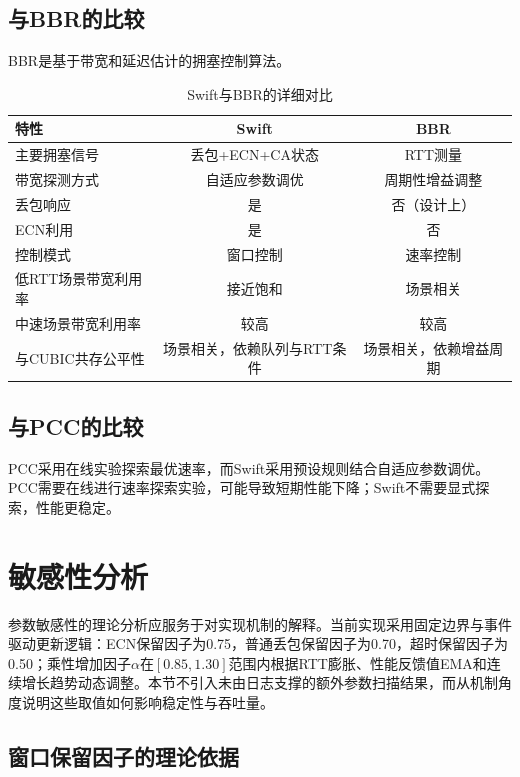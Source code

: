 \subsection{与BBR的比较}

BBR是基于带宽和延迟估计的拥塞控制算法。

\begin{table}[htbp]
\centering
\caption{Swift与BBR的详细对比}
\label{tab:vs_bbr}
\begin{tabular}{|l|c|c|}
\hline
\textbf{特性} & \textbf{Swift} & \textbf{BBR} \\
\hline
主要拥塞信号 & 丢包+ECN+CA状态 & RTT测量 \\
带宽探测方式 & 自适应参数调优 & 周期性增益调整 \\
丢包响应 & 是 & 否（设计上） \\
ECN利用 & 是 & 否 \\
控制模式 & 窗口控制 & 速率控制 \\
低RTT场景带宽利用率 & 接近饱和 & 场景相关 \\
中速场景带宽利用率 & 较高 & 较高 \\
与CUBIC共存公平性 & 场景相关，依赖队列与RTT条件 & 场景相关，依赖增益周期 \\
\hline
\end{tabular}
\end{table}

\subsection{与PCC的比较}

PCC采用在线实验探索最优速率，而Swift采用预设规则结合自适应参数调优。PCC需要在线进行速率探索实验，可能导致短期性能下降；Swift不需要显式探索，性能更稳定。

\section{敏感性分析}

参数敏感性的理论分析应服务于对实现机制的解释。当前实现采用固定边界与事件驱动更新逻辑：ECN保留因子为0.75，普通丢包保留因子为0.70，超时保留因子为0.50；乘性增加因子$\alpha$在$[0.85,1.30]$范围内根据RTT膨胀、性能反馈值EMA和连续增长趋势动态调整。本节不引入未由日志支撑的额外参数扫描结果，而从机制角度说明这些取值如何影响稳定性与吞吐量。

\subsection{窗口保留因子的理论依据}

